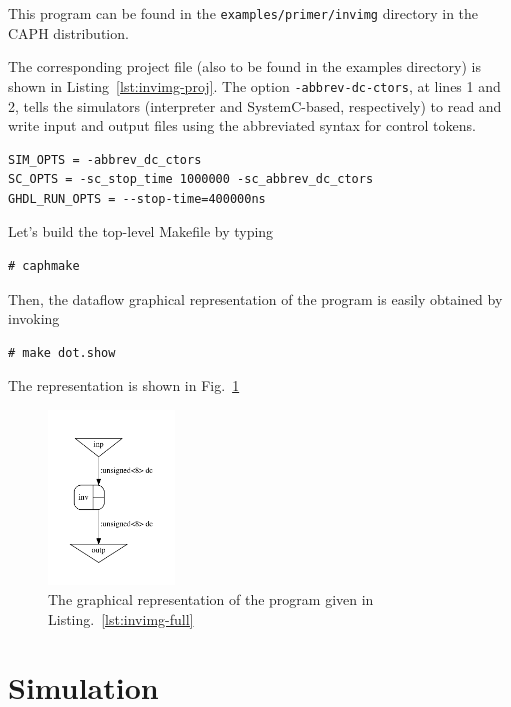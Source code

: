 \medskip
This program can be found in the \verb|examples/primer/invimg| directory in the CAPH distribution.

The corresponding project file (also to be found in the examples directory) is shown in
Listing~\ref{lst:invimg-proj}.  The option \verb|-abbrev-dc-ctors|, at lines 1 and 2, tells the
simulators (interpreter and SystemC-based, respectively) to read and write input and output files
using the abbreviated syntax for control tokens. 

\begin{lstlisting}[style=MakeStyle,caption={File
    \texttt{invimg.proj} for the \texttt{invimg} program of Listing~\ref{lst:invimg-full}},label={lst:invimg-proj}]
SIM_OPTS = -abbrev_dc_ctors
SC_OPTS = -sc_stop_time 1000000 -sc_abbrev_dc_ctors
GHDL_RUN_OPTS = --stop-time=400000ns
\end{lstlisting}

Let's build the top-level Makefile by typing

\begin{lstlisting}[style=BashInputStyle]
# caphmake
\end{lstlisting}

Then, the dataflow graphical representation of the program is easily obtained by invoking 

\begin{lstlisting}[style=BashInputStyle]
# make dot.show
\end{lstlisting}

The representation is shown in Fig.~\ref{fig:inv-dot}

\begin{figure}[htbp]
  \centering
 \includegraphics[width=0.3\textwidth]{./figs/inv-dot.pdf}
  \caption{The graphical representation of the program given in Listing.~\ref{lst:invimg-full}}
  \label{fig:inv-dot}
\end{figure}

\section{Simulation}
\label{sec:simulation-2}

